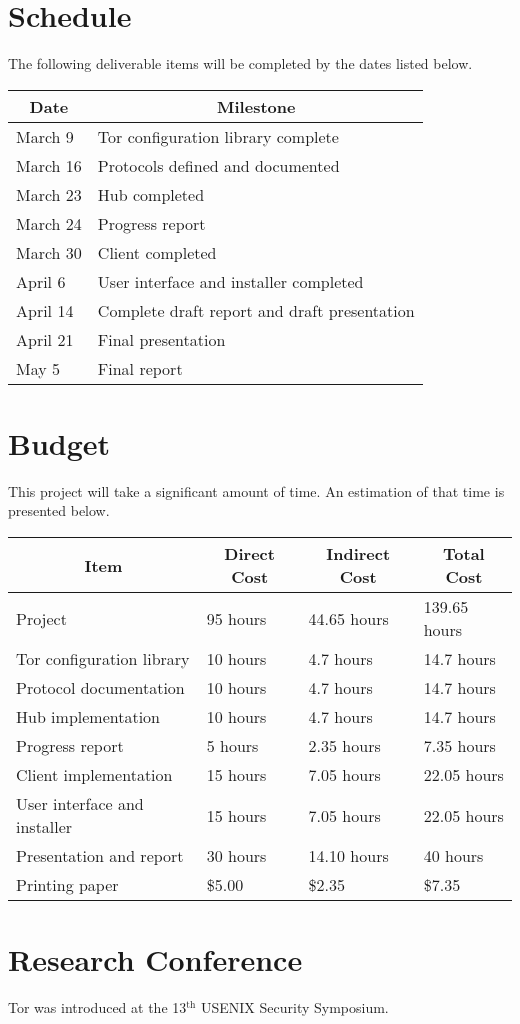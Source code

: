 \documentclass{article}
\newcommand{\s}{\hspace{1em}}
\begin{document}
\section{Schedule}
The following deliverable items will be completed by the dates listed below.

\begin{center}
\begin{tabular}{ll}
\multicolumn{1}{c}{\bf Date} & \multicolumn{1}{c}{\bf Milestone}\\
\hline
March 9 & Tor configuration library complete\\
March 16 & Protocols defined and documented\\
March 23 & Hub completed\\
March 24 & Progress report\\
March 30 & Client completed\\
April 6 & User interface and installer completed\\
April 14 & Complete draft report and draft presentation\\
April 21 & Final presentation\\
May 5 & Final report
\end{tabular}
\end{center}

\section{Budget}
This project will take a significant amount of time.  An estimation of that time is presented below.

{\scriptsize
\begin{center}
\begin{tabular}{llll}
\multicolumn{1}{c}{\bf Item} & \multicolumn{1}{c}{\bf Direct Cost} & \multicolumn{1}{c}{\bf Indirect Cost} & \multicolumn{1}{c}{\bf Total Cost}\\
\hline
Project & 95 hours & 44.65 hours & 139.65 hours\\
\s Tor configuration library & \s 10 hours & \s 4.7 hours & \s 14.7 hours\\
\s Protocol documentation & \s 10 hours & \s 4.7 hours & \s 14.7 hours\\
\s Hub implementation & \s 10 hours & \s 4.7 hours & \s 14.7 hours\\
\s Progress report & \s 5 hours & \s 2.35 hours & \s 7.35 hours \\
\s Client implementation & \s 15 hours & \s 7.05 hours & \s 22.05 hours\\
\s User interface and installer & \s 15 hours & \s 7.05 hours & \s 22.05 hours\\
\s Presentation and report & \s 30 hours & \s 14.10 hours & \s 40 hours\\
Printing paper & \$5.00 & \$2.35 & \$7.35
\end{tabular}
\end{center}
}

\appendix
\section{Research Conference}
Tor was introduced at the 13$^{\textrm{th}}$ USENIX Security Symposium.
\end{document}

